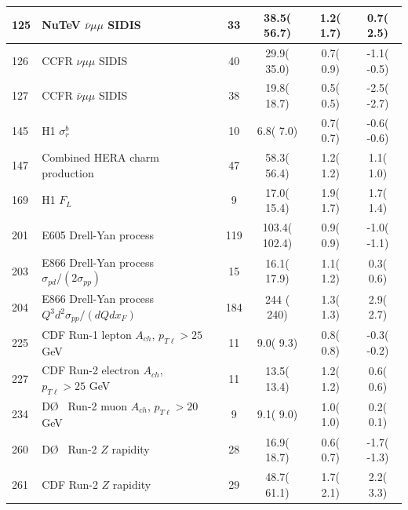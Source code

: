 \begin{table}[htbp]
\begin{tabular}{|l|lr|c|c|c|c|}
 125 & NuTeV $\bar\nu \mu\mu$ SIDIS                                                        & \cite{Mason:2006qa}         &   33  &    38.5(  56.7) &   1.2( 1.7) &   0.7(  2.5)   \tabularnewline\hline
 126 & CCFR $\nu\mu\mu$ SIDIS                                                              & \cite{Goncharov:2001qe}     &   40  &    29.9(  35.0) &   0.7( 0.9) &  -1.1( -0.5)   \tabularnewline\hline
 127 & CCFR  $\bar\nu \mu\mu$ SIDIS                                                        & \cite{Goncharov:2001qe}     &   38  &    19.8(  18.7) &   0.5( 0.5) &  -2.5( -2.7)   \tabularnewline\hline
 145 & H1 $\sigma_{r}^{b}$                                                                 & \cite{Aktas:2004az}         &   10  &     6.8(   7.0) &   0.7( 0.7) &  -0.6( -0.6)   \tabularnewline\hline
 147 & Combined HERA charm production                                                      & \cite{Abramowicz:1900rp}    &   47  &    58.3(  56.4) &   1.2( 1.2) &   1.1(  1.0)   \tabularnewline\hline
 169 & H1 $F_{L}$                                                                          & \cite{Collaboration:2010ry} &    9  &    17.0(  15.4) &   1.9( 1.7) &   1.7(  1.4)   \tabularnewline\hline
 201 & E605 Drell-Yan process                                                              & \cite{Moreno:1990sf}        &  119  &   103.4( 102.4) &   0.9( 0.9) &  -1.0( -1.1)   \tabularnewline\hline
 203 & E866 Drell-Yan process  $\sigma_{pd}/(2\sigma_{pp})$                                & \cite{Towell:2001nh}        &   15  &    16.1(  17.9) &   1.1( 1.2) &   0.3(  0.6)   \tabularnewline\hline
 204 & E866 Drell-Yan process  $Q^3 d^2\sigma_{pp}/(dQ dx_F)$                              & \cite{Webb:2003ps}          &  184  &   244 ( 240) &   1.3( 1.3) &   2.9(  2.7)   \tabularnewline\hline
 225 & CDF Run-1 lepton $A_{ch}$, $p_{T\ell}>25$ GeV                                    & \cite{Abe:1998rv}           &   11  &     9.0(   9.3) &   0.8( 0.8) &  -0.3( -0.2)   \tabularnewline\hline
 227 & CDF Run-2 electron $A_{ch}$, $p_{T\ell}>25$ GeV                                     & \cite{Acosta:2005ud}        &   11  &    13.5(  13.4) &   1.2( 1.2) &   0.6(  0.6)   \tabularnewline\hline
 234 & D\O~ Run-2 muon $A_{ch}$, $p_{T\ell}>20$ GeV                                        & \cite{Abazov:2007pm}        &    9  &     9.1(   9.0) &   1.0( 1.0) &   0.2(  0.1)   \tabularnewline\hline
 260 & D\O~ Run-2 $Z$ rapidity                       & 
 \cite{Abazov:2007jy}        &   28  &    16.9(  18.7) &   0.6( 0.7) &  -1.7( -1.3)   \tabularnewline\hline
 261 & CDF Run-2 $Z$ rapidity                                                              & \cite{Aaltonen:2010zza}     &   29  &    48.7(  61.1) &   1.7( 2.1) &   2.2(  3.3)   \tabularnewline\hline

\end{tabular}
\end{table}
